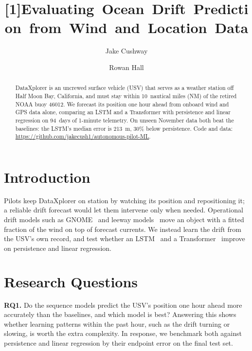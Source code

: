 \documentclass[sigconf]{acmart}
\begin{document}
\title{\mbox{\scalebox{0.985}[1]{Evaluating Ocean Drift Prediction from Wind and Location Data}}}
\author{Jake Cushway}

\author{Rowan Hall}


\begin{abstract}
DataXplorer is an uncrewed surface vehicle (USV) that serves as a weather station off Half Moon Bay, California, and must stay within 10~nautical miles (NM) of the retired NOAA buoy 46012. We forecast its position one hour ahead from onboard wind and GPS data alone, comparing an LSTM and a Transformer with persistence and linear regression on 94~days of 1-minute telemetry. On unseen November data both beat the baselines: the LSTM's median error is 213~m, 30\% below persistence. Code and data: \mbox{\url{https://github.com/jakecush1/autonomous-pilot-ML}}.
\end{abstract}

\maketitle
\pagestyle{empty}

\section{Introduction}
Pilots keep DataXplorer on station by watching its position and repositioning it; a reliable drift forecast would let them intervene only when needed. Operational drift models such as GNOME~\cite{zelenke2012gnome} and leeway models~\cite{breivik2011leeway} move an object with a fitted fraction of the wind on top of forecast currents. We instead learn the drift from the USV's own record, and test whether an LSTM~\cite{hochreiter1997lstm} and a Transformer~\cite{vaswani2017attention} improve on persistence and linear regression.


\section{Research Questions}
\noindent\textbf{RQ1.} Do the sequence models predict the USV's position one hour ahead more accurately than the baselines, and which model is best? Answering this shows whether learning patterns within the past hour, such as the drift turning or slowing, is worth the extra complexity. In response, we benchmark both against persistence and linear regression by their endpoint error on the final test set.
\end{document}

